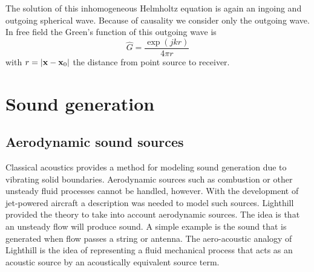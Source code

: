 The solution of this inhomogeneous Helmholtz equation is again an
ingoing and outgoing spherical wave. Because of causality we consider only the
outgoing wave. In free field the Green's function of this outgoing wave is
\begin{equation}\label{eq:theory:sound:green-free-field}
  \hat{G} = \frac{\exp{\left(jkr\right)}}{4 \pi r}
\end{equation}
with $r = \left| \mathbf{x} - \mathbf{x}_0 \right|$ the distance from point source to receiver.


\section{Sound generation}

\subsection{Aerodynamic sound sources}\label{sec:theory:sound:aerodynamic}
Classical acoustics provides a method for modeling sound generation due to
vibrating solid boundaries. Aerodynamic sources such as combustion or other
unsteady fluid processes cannot be handled, however. With the development of
jet-powered aircraft a description was needed to model such sources. Lighthill
provided the theory to take into account aerodynamic sources. The idea is that
an unsteady flow will produce sound. A simple example is the sound that is
generated when flow passes a string or antenna.
The aero-acoustic analogy of Lighthill is the idea of representing a fluid
mechanical process that acts as an acoustic source by an acoustically equivalent
source term.


